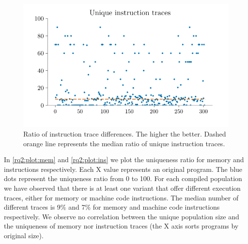 \documentclass[sigplan,screen]{acmart}
\begin{document}
\begin{figure}
    \centering
    \includegraphics[width=\linewidth]{plots/rq2/instructions.pdf}
    \caption{Ratio of instruction trace differences. The higher the better. Dashed orange line represents the median ratio of unique instruction traces.}
  \label{rq2:plot:ins}
\end{figure}


\newcommand{\memratio}{9\%\xspace}
\newcommand{\insratio}{7\%\xspace}

In \autoref{rq2:plot:mem} and \autoref{rq2:plot:ins} we plot the uniqueness ratio for memory and instructions respectively.
Each X value represents an original program.
The blue dots represent the uniqueness ratio from 0 to 100.
For each compiled population we have observed that there is at least one variant that offer different execution traces, either for memory or machine code instructions.
The median number of different traces is \memratio and \insratio for memory and machine code instructions respectively.
We observe no correlation between the unique population size and the uniqueness of memory nor instruction traces (the X axis sorts programs by original size).
\end{document}
